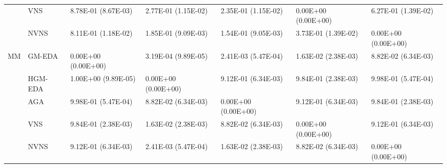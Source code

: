 \begin{tabular}{lllllll}
   & VNS &  8.78E-01 (8.67E-03) &  2.77E-01 (1.15E-02) &  2.35E-01 (1.15E-02) &  0.00E+00 (0.00E+00) &  6.27E-01 (1.39E-02) \\
   & NVNS &  8.11E-01 (1.18E-02) &  1.85E-01 (9.09E-03) &  1.54E-01 (9.05E-03) &  3.73E-01 (1.39E-02) &  0.00E+00 (0.00E+00) \\
MM & GM-EDA &  0.00E+00 (0.00E+00) &  3.19E-04 (9.89E-05) &  2.41E-03 (5.47E-04) &  1.63E-02 (2.38E-03) &  8.82E-02 (6.34E-03) \\
   & HGM-EDA &  1.00E+00 (9.89E-05) &  0.00E+00 (0.00E+00) &  9.12E-01 (6.34E-03) &  9.84E-01 (2.38E-03) &  9.98E-01 (5.47E-04) \\
   & AGA &  9.98E-01 (5.47E-04) &  8.82E-02 (6.34E-03) &  0.00E+00 (0.00E+00) &  9.12E-01 (6.34E-03) &  9.84E-01 (2.38E-03) \\
   & VNS &  9.84E-01 (2.38E-03) &  1.63E-02 (2.38E-03) &  8.82E-02 (6.34E-03) &  0.00E+00 (0.00E+00) &  9.12E-01 (6.34E-03) \\
   & NVNS &  9.12E-01 (6.34E-03) &  2.41E-03 (5.47E-04) &  1.63E-02 (2.38E-03) &  8.82E-02 (6.34E-03) &  0.00E+00 (0.00E+00) \\
\bottomrule
\end{tabular}
